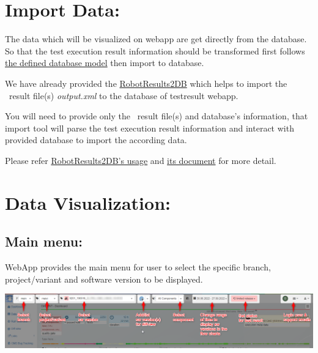 \hypertarget{import-data}{%
\section{Import Data:}\label{import-data}}

The data which will be visualized on webapp are get directly from the database.
So that the test execution result information should be transformed first 
follows \href{https://github.com/test-fullautomation/testresultwebapp/blob/
develop/TestResultWebApp/mysql_server/datamodel/datamodel.svg}
{the defined database model} then import to database.

We have already provided the \href{https://github.com/test-fullautomation/
robotframework-testresultwebapptool}{RobotResults2DB} which helps to import the
\rfwcore\ result file(s) \emph{output.xml} to the database of testresult webapp.

You will need to provide only the \rfwcore\ result file(s) and database's 
information, that import tool will parse the test execution result information 
and interact with provided database to import the according data.

Please refer \href{https://github.com/test-fullautomation/
robotframework-testresultwebapptool#usage}{RobotResults2DB's usage} and 
\href{https://github.com/test-fullautomation/robotframework-
testresultwebapptool/blob/develop/RobotResults2DB/RobotResults2DB.pdf}
{its document} for more detail.


\hypertarget{data-visualization}{%
\section{Data Visualization:}\label{data-visualization}}

\hypertarget{main-menu}{%
\subsection{Main menu:}\label{main-menu}}
WebApp provides the main menu for user to select the specific branch, 
project/variant and software version to be displayed.

\includegraphics[width=1\linewidth]{./pictures/main-menu.png}

